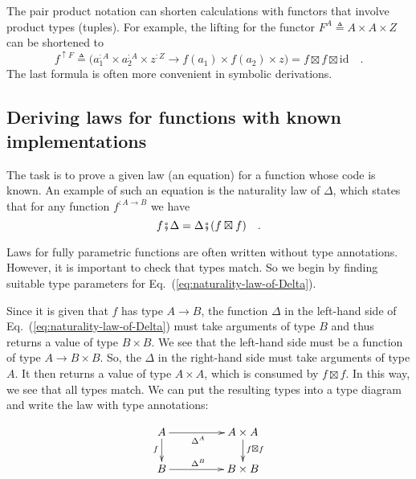 The pair product notation can shorten calculations with functors that
involve product types (tuples). For example, the lifting for the functor
$F^{A}\triangleq A\times A\times Z$ can be shortened to
\[
f^{\uparrow F}\triangleq\big(a_{1}^{:A}\times a_{2}^{:A}\times z^{:Z}\rightarrow f(a_{1})\times f(a_{2})\times z\big)=f\boxtimes f\boxtimes\text{id}\quad.
\]
The last formula is often more convenient in symbolic derivations. 

\subsection{Deriving laws for functions with known implementations\label{subsec:Deriving-laws-for-functions-}}

The task is to prove a given law (an equation) for a function whose
code is known. An example of such an equation is the naturality
law of $\Delta$, which states that for any function $f^{:A\rightarrow B}$
we have
\begin{equation}
f\bef\Delta=\Delta\bef(f\boxtimes f)\quad.\label{eq:naturality-law-of-Delta}
\end{equation}

Laws for fully parametric functions are often written without type
annotations. However, it is important to check that types match. So
we begin by finding suitable type parameters for Eq.~(\ref{eq:naturality-law-of-Delta}).

Since it is given that $f$ has type $A\rightarrow B$, the function
$\Delta$ in the left-hand side of Eq.~(\ref{eq:naturality-law-of-Delta})
must take arguments of type $B$ and thus returns a value of type
$B\times B$. We see that the left-hand side must be a function of
type $A\rightarrow B\times B$. So, the $\Delta$ in the right-hand
side must take arguments of type $A$. It then returns a value of
type $A\times A$, which is consumed by $f\boxtimes f$. In this way,
we see that all types match. We can put the resulting types into a
type diagram and write the law with type annotations:

\begin{wrapfigure}{L}{0.25\columnwidth}%
\vspace{-2\baselineskip}
\[
\xymatrix{\xyScaleY{1.6pc}\xyScaleX{4.0pc}A\ar[d]\sb(0.45){f}\ar[r]\sb(0.45){\Delta^{A}} & A\times A\ar[d]\sp(0.45){f\boxtimes f}\\
B\ar[r]\sp(0.45){\Delta^{B}} & B\times B
}
\]
\vspace{-0.1\baselineskip}
\end{wrapfigure}%


